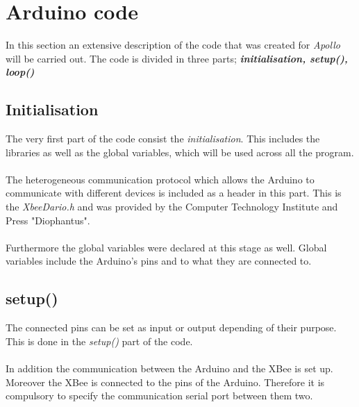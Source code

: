 \documentclass[12pt,a4paper,draft]{report}
\begin{document}
\section{Arduino code}
In this section an extensive description of the code that was created for \emph{Apollo} will be carried out. The code is divided in three parts; \textit{\textbf{initialisation, setup(), loop()}}
%
\subsection{Initialisation}
The very first part of the code consist the \textit{initialisation}. This includes the libraries as well as the global variables, which will be used across all the program.\\
\ \\
The heterogeneous communication protocol which allows the Arduino to communicate with different devices is included as a header in this part. This is the \textit{XbeeDario.h} and was provided by the Computer Technology Institute and Press "Diophantus".\\
\ \\
Furthermore the global variables were declared at this stage as well. Global variables include the Arduino's pins and to what they are connected to. 
%
\subsection{setup()}
The connected pins can be set as input or output depending of their purpose. This is done in the \textit{setup()} part of the code.\\
\ \\
In addition the communication between the Arduino and the XBee is set up. Moreover the XBee is connected to the pins of the Arduino. Therefore it is compulsory to specify the communication serial port between them two.
%
\end{document}
